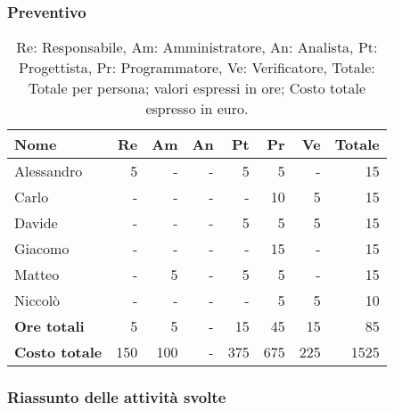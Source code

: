 \subsubsection{Preventivo}

\begin{table}[H]
	\centering
	\begin{tabular}{l|r|r|r|r|r|r|r}
		\textbf{Nome}         & \textbf{Re} & \textbf{Am} & \textbf{An} & \textbf{Pt} & \textbf{Pr} & \textbf{Ve} & \textbf{Totale} \\
		\hline
		Alessandro            & 5           & -           & -           & 5           & 5           & -           & 15              \\
		Carlo                 & -           & -           & -           & -           & 10           & 5           & 15              \\
		Davide                & -           & -           & -           & 5           & 5           & 5           & 15              \\
		Giacomo               & -           & -           & -           & -           & 15          	& -           & 15              \\
		Matteo                & -           & 5           & -           & 5           & 5           & -           & 15              \\
		Niccolò               & -           & -           & -           & -           & 5           & 5           & 10              \\
		\hline
		\textbf{Ore totali}   & 5           & 5           & -           & 15          & 45          & 15          & 85              \\
		\textbf{Costo totale} & 150         & 100         & -           & 375         & 675         & 225         & 1525
	\end{tabular}
	\caption{Re: Responsabile, Am: Amministratore, An: Analista, Pt: Progettista,
		Pr: Programmatore, Ve: Verificatore, Totale: Totale per persona; valori espressi in ore; Costo totale espresso in euro.}
\end{table}

\subsubsection{Riassunto delle attività svolte}

